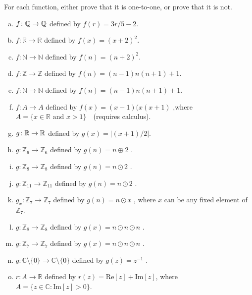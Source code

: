 \begin{exercise}{40} 
For each function, either prove that it is one-to-one, or prove that it is not.
\begin{enumerate}[(a)]
\item \label{IsIt11?-linear}
 $f \colon \mathbb{Q} \to \mathbb{Q}$ defined by $f(r)=3r/5 - 2$.
\item \label{IsIt11?-square0}
 $f \colon {\mathbb R} \to {\mathbb R}$ defined by $f(x)=(x+2)^2$.
\item \label{IsIt11?-square}
 $f \colon {\mathbb N} \to {\mathbb N}$ defined by $f(n)=(n+2)^2$.
\item
 $f \colon {\mathbb Z} \to {\mathbb Z}$ defined by $f(n)=(n-1)n(n+1)+1$.
\item
 $f \colon {\mathbb N} \to {\mathbb N}$ defined by $f(n)=(n-1)n(n+1)+1$.
\item
 $f \colon A \to A$ defined by $f(x)=(x-1)(x(x+1)$ ,where \\
 $A =\{x \in \mathbb{R} \text{ and }x >1 \}$~~(requires calculus).
\item \label{IsIt11?-abs}
 $g \colon \mathbb{R} \to \mathbb{R}$ defined by $g(x)= \left|(x+1)/2 \right|$.
\item \label{modular_g}
 $g \colon {\mathbb Z}_6 \to {\mathbb Z}_6$ defined by $g(n)= n \oplus 2$ .
\item \label{modular_m}
 $g \colon {\mathbb Z}_8 \to {\mathbb Z}_8$ defined by $g(n) = n \odot 2 $ .
\item \label{modular_m2}
 $g \colon {\mathbb Z}_{11} \to {\mathbb Z}_{11}$ defined by $g(n) =  n \odot 2$ .
\item 
 $g_x \colon {\mathbb Z}_7 \to {\mathbb Z}_7$ defined by $g(n)= n \odot x$ , where $x$ can be any 
fixed element of ${\mathbb Z}_7$.
\item 
 $g \colon {\mathbb Z}_8 \to {\mathbb Z}_8$ defined by $g(x)= n \odot n \odot n$ .
\item 
 $g \colon {\mathbb Z}_7 \to {\mathbb Z}_7$ defined by $g(x)= n \odot n \odot n$ .
\item
 $g \colon {\mathbb C}\setminus \{0\}  \to {\mathbb C}\setminus \{0\} $ defined by $g(z) =  z^{-1}$ .
\item
 $r \colon A  \to {\mathbb R} $ defined by  
$r(z) = \text{Re}[z] + \text{Im}[z]$, where \\
 $A = \{ z \in  \mathbb{C}: \text{Im}[z] > 0 \}$. 

 \end{enumerate}
\end{exercise}

